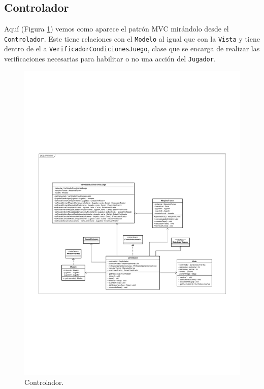 	\subsection{Controlador}
	
	Aquí (Figura \ref{class_Controlador}) vemos como aparece el patrón MVC mirándolo desde el \texttt{Controlador}. Este tiene relaciones con el \texttt{Modelo} al igual que con la \texttt{Vista} y tiene dentro de el a
	\texttt{VerificadorCondicionesJuego}, clase que se encarga de realizar las verificaciones necesarias para habilitar o no una acción del \texttt{Jugador}.
	
	\begin{figure}[H]
		\centering
		\includegraphics[scale=0.8]{includes/class_Controlador}
		\caption{Controlador.}
		\label{class_Controlador}
	\end{figure}
	
